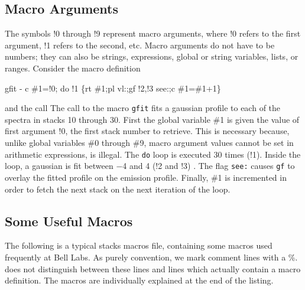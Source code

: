\subsection{Macro Arguments}

The symbols !0 through !9 represent macro arguments, where !0 refers
to the first argument, !1 refers to the second, etc. Macro arguments
do not have to be numbers; they can also be strings, expressions, global or
string variables, lists, or ranges.
Consider the macro definition
\begin{description}
\item{gfit - c \#1=!0; do !1 \{rt \#1;pl vl:;gf !2,!3 see:;c \#1=\#1+1\} }{\ }
\end{description}
\noindent
and the call 
\smallskip \noindent
The call to the macro {\tt gfit} fits a gaussian profile to each of the spectra in
stacks 10 through 30. First the global variable \#1 is given the value of
first argument !0, \ie the first stack number to retrieve. 
This is necessary because, unlike global variables 
\#0 through \#9, macro argument values cannot be set in 
arithmetic expressions,  is illegal.
The {\tt do} loop is executed 30 times (!1). Inside the loop, a gaussian is fit
between $-$4 and 4 (!2 and !3) \kms. The flag {\tt see:} causes {\tt gf} to
overlay the fitted profile on the emission profile.
Finally, \#1 is incremented in order to fetch the next
stack on the next iteration of the loop.

\subsection{Some Useful Macros}
\label{sec-usmac}
The following is a typical stacks macros file, containing some macros
used frequently at Bell Labs.  As purely convention, we mark comment lines 
with a \%. \COMB does not distinguish between these lines and lines which 
actually contain a macro definition. The macros are individually explained
at the end of the listing.


